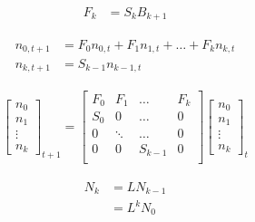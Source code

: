 \documentclass[12pt]{article}
\begin{document}
\begin{align}
F_{k} & = S_{k} \textit{B}_{k+1} \nonumber 
\end{align} 

\begin{align}
\textit{n}_{0, t+1} & = F_{0} \textit{n}_{0, t}+F_{1} \textit{n}_{1, t}+ \dots + F_{k} \textit{n}_{k, t} \\
\textit{n}_{k, t+1} & = S_{k-1} \textit{n}_{k-1, t}
\end{align} 

\begin{align}
\begin{bmatrix}
n_{0} 
\\n_{1} 
\\\vdots
\\n_{k}  
\end{bmatrix}_{t+1}
=
\begin{bmatrix}
 F_{0} & F_{1} & \dots & F_{k} \\ 
 S_{0} & 0 & \dots & 0 \\ 
 0 & \ddots & \dots & 0 \\ 
 0 & 0 & S_{k-1} & 0 \\ 
\end{bmatrix}
\begin{bmatrix}
n_{0} 
\\n_{1} 
\\\vdots
\\n_{k}  
\end{bmatrix}_{t} \nonumber
\end{align} 

\begin{align}
\textbf{$\textit{N}_{k}$} & = \textbf{$\textit{L}$} \textbf{$\textit{N}_{k-1}$} \nonumber \\
& = \textbf{$\textit{L}$}^{k} \textbf{$\textit{N}_{0}$}
\end{align} 
\end{document}
